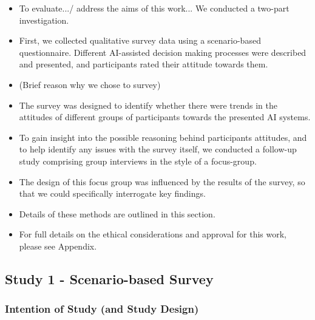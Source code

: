 \documentclass[manuscript,screen,review]{acmart}
\begin{document}


\begin{itemize}
\item To evaluate.../ address the aims of this work... We conducted a two-part investigation.
\item First, we collected qualitative survey data using a scenario-based questionnaire. Different AI-assisted decision making processes were described and presented, and participants rated their attitude towards them.
\item (Brief reason why we chose to survey)
\end{itemize}
\begin{itemize}
\item The survey was designed to identify whether there were trends in the attitudes of different groups of participants towards the presented AI systems. 
\item To gain insight into the possible reasoning behind participants attitudes, and to help identify any issues with the survey itself, we conducted a follow-up study comprising group interviews in the style of a focus-group.
\item The design of this focus group was influenced by the results of the survey, so that we could specifically interrogate key findings. 
\item Details of these methods are outlined in this section. 
\item For full details on the ethical considerations and approval for this work, please see Appendix.
\end{itemize}


\subsection{Study 1 - Scenario-based Survey }
\subsubsection{Intention of Study (and Study Design)} 
\label{study1_intentions}

\end{document}
